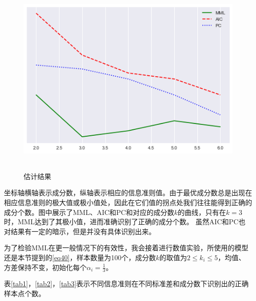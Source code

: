 \documentclass[a4paper,12pt,openany,oneside,utf-8]{ctexbook}
\begin{document}
	\begin{figure}[H]
		\centering
		\includegraphics[width=140mm,height=90mm]{figure/1.3.png}\\
		\caption{估计结果}\label{f2}
	\end{figure}
	
	坐标轴横轴表示成分数，纵轴表示相应的信息准则值。由于最优成分数总是出现在相应信息准则的极大值或极小值处，因此在它们值的拐点处我们往往能得到正确的成分个数。图中展示了MML、AIC和PC和对应的成分数$k$的曲线，只有在$k=3$时，MML达到了其极小值，进而准确识别了正确的成分个数。
	虽然AIC和PC也对结果有一定的暗示，但是并没有具体识别出来。
	
	为了检验MML在更一般情况下的有效性，我会接着进行数值实验，所使用的模型还是本节提到的\ref{eq40}，样本数量为100个，成分数$k$的取值为$2\leq k_i\leq 5$，均值、方差保持不变，初始化每个$\alpha_i=\frac{1}{3}$。
	
    表\ref{tab1}，\ref{tab2}，\ref{tab3}表示不同信息准则在不同标准差和成分数下识别出的正确样本点个数。
\end{document}
